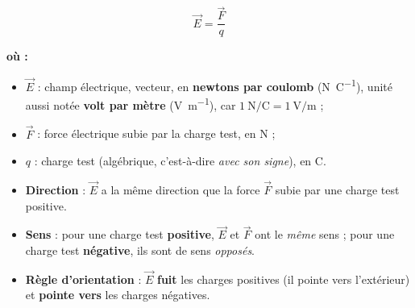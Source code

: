 \documentclass[11pt,a4paper]{article}
\newenvironment{ou}{%
  \par\smallskip\noindent\textbf{où :}\nopagebreak
  \begin{itemize}[leftmargin=1.8em,topsep=2pt,itemsep=1.5pt,parsep=0pt]}%
  {\end{itemize}}
\newcommand{\vc}[1]{\vec{#1}}
\begin{document}
\begin{formule}
\[ \vc{E} = \dfrac{\vc{F}}{q} \]
\begin{ou}
  \item $\vc{E}$ : champ électrique, vecteur, en \textbf{newtons par coulomb} (\si{\newton\per\coulomb}),
        unité aussi notée \textbf{volt par mètre} (\si{\volt\per\metre}), car $\SI{1}{\newton\per\coulomb}
        = \SI{1}{\volt\per\metre}$ ;
  \item $\vc{F}$ : force électrique subie par la charge test, en \si{\newton} ;
  \item $q$ : charge test (algébrique, c'est-à-dire \emph{avec son signe}), en \si{\coulomb}.
\end{ou}
\end{formule}

\begin{theoreme}
\leavevmode
\begin{itemize}[leftmargin=1.6em,topsep=2pt,itemsep=2pt]
  \item \textbf{Direction} : $\vc{E}$ a la même direction que la force $\vc{F}$ subie par une charge
        test positive.
  \item \textbf{Sens} : pour une charge test \textbf{positive}, $\vc{E}$ et $\vc{F}$ ont le
        \emph{même} sens ; pour une charge test \textbf{négative}, ils sont de sens \emph{opposés}.
  \item \textbf{Règle d'orientation} : $\vc{E}$ \textbf{fuit} les charges positives (il pointe
        vers l'extérieur) et \textbf{pointe vers} les charges négatives.
\end{itemize}
\end{theoreme}

\begin{center}
\end{center}
\end{document}
